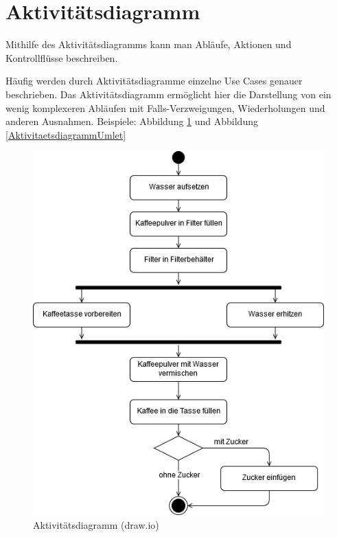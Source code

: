 \documentclass[a4paper, titlepage]{scrartcl}
\begin{document}
    \section{Aktivitätsdiagramm}
    Mithilfe des Aktivitätsdiagramms kann man Abläufe, Aktionen und
    Kontrollflüsse beschreiben.

    Häufig werden durch Aktivitätsdiagramme einzelne Use Cases genauer
    beschrieben. Das Aktivitätsdiagramm ermöglicht hier die Darstellung
    von ein wenig komplexeren Abläufen mit Falls-Verzweigungen, Wiederholungen
    und anderen Ausnahmen.
    Beispiele: Abbildung \ref{AktivitaetsdiagrammDrawIO} und Abbildung \ref{AktivitaetsdiagrammUmlet}
    \begin{figure}
        \includegraphics[width=\textwidth]{Aktivitaetsdiagramm1a.png}
        \caption{Aktivitätsdiagramm (draw.io)}
        \label{AktivitaetsdiagrammDrawIO}
    \end{figure}
\end{document}
